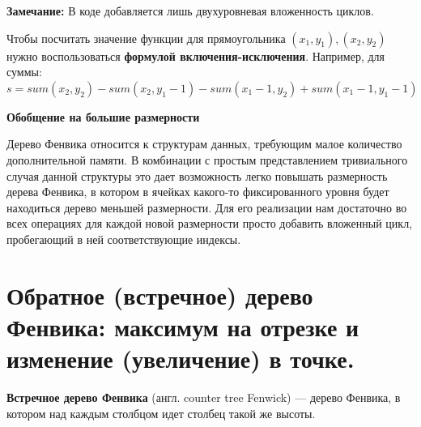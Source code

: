 \par \textbf{Замечание: } В коде добавляется лишь двухуровневая вложенность циклов.
\\ \par \noindent Чтобы посчитать значение функции для прямоугольника $(x_1,y_1),(x_2,y_2)$ нужно воспользоваться \textbf{формулой включения-исключения}. Например, для суммы: $s=sum(x_2,y_2)-sum(x_2,y_1-1)-sum(x_1-1,y_2)+sum(x_1-1,y_1-1)$
\newline \newline \par \textbf{Обобщение на большие размерности}
 \par \noindent  Дерево Фенвика относится к структурам данных, требующим малое количество дополнительной памяти. В комбинации с простым представлением тривиального случая данной структуры это дает возможность легко повышать размерность дерева Фенвика, в котором в ячейках какого-то фиксированного уровня будет находиться дерево меньшей размерности. Для его реализации нам достаточно во всех операциях для каждой новой размерности просто добавить вложенный цикл, пробегающий в ней соответствующие индексы.


\newpage
\setcounter{section}{71}
\section{Обратное (встречное) дерево Фенвика: максимум на отрезке и изменение (увеличение) в точке. }
\textbf{Встречное дерево Фенвика} (англ. counter tree Fenwick) — дерево Фенвика, в котором над каждым столбцом идет столбец такой же высоты.

